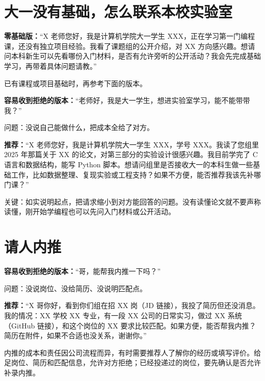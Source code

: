 \documentclass[UTF8,zihao=5,openany]{ctexbook}
\begin{document}
\section{大一没有基础，怎么联系本校实验室}
\begin{casebox}
\textbf{零基础版：}“X 老师您好，我是计算机学院大一学生 XXX，正在学习第一门编程课，还没有独立项目经验。我看了课题组的公开介绍，对 XX 方向感兴趣。想请问本科新生可以先看哪份入门材料，是否有允许旁听的公开活动？我会先完成基础学习，再带着具体问题请教。”
\end{casebox}
已有课程或项目基础时，再参考下面的版本。
\begin{casebox}
\textbf{容易收到拒绝的版本：}“老师好，我是大一学生，想进实验室学习，能不能带带我？”
\end{casebox}

问题：没说自己能做什么，把成本全给了对方。

\begin{casebox}
\textbf{推荐：}“X 老师您好，我是计算机学院大一学生 XXX，学号 XXX。我读了您组里 2025 年那篇关于 XX 的论文，对第三部分的实验设计很感兴趣。我目前学完了 C 语言和数据结构，能写 Python 脚本。想请问组里是否接收大一的本科生做一些基础工作，比如数据整理、复现实验或工程支持？如果不方便，能否推荐我该先补哪门课？”
\end{casebox}

关键：如实说明起点，把请求缩小到对方能回答的问题。没有读懂论文就不要声称读懂，刚开始学编程也可以先问入门材料或公开活动。

\section{请人内推}
\begin{casebox}
\textbf{容易收到拒绝的版本：}“哥，能帮我内推一下吗？”
\end{casebox}

问题：没说岗位、没给简历、没说明匹配点。

\begin{casebox}
\textbf{推荐：}“X 哥你好，看到你们组在招 XX 岗（JD 链接），我投了简历但还没消息。我的情况：XX 学校 XX 专业，有一段 XX 公司的日常实习，做过 XX 系统（GitHub 链接），和这个岗位的 XX 要求比较匹配。如果方便，能否帮我内推？简历在附件，如果不合适也没关系，谢谢你。”
\end{casebox}

内推的成本和责任因公司流程而异，有时需要推荐人了解你的经历或填写评价。给足岗位、简历和匹配信息，允许对方拒绝；已经投递过的岗位，要先确认是否允许补录内推。
\end{document}
